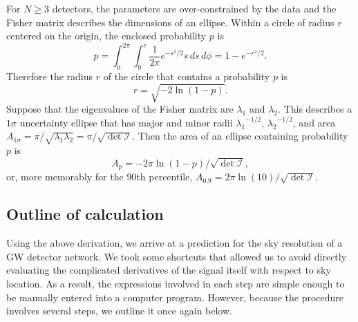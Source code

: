 \documentclass[amsmath,amssymb,aps,prx,reprint,nopreprintnumbers,nofootinbib,showpacs]{revtex4-1}
\begin{document}
For $N \geq 3$ detectors, the parameters are over\nobreakdashes-constrained by the data and the Fisher matrix describes the dimensions of an ellipse. Within a circle of radius $r$ centered on the origin, the enclosed probability $p$ is
%
\begin{equation}
    p = \int_0^{2\pi} \int_0^r \frac{1}{2\pi} e^{-s^2/2} s \, ds \, d\phi = 1 - e^{-r^2/2}.
\end{equation}
%
Therefore the radius $r$ of the circle that contains a probability $p$ is
%
\begin{equation}
    r = \sqrt{-2\ln (1 - p)}.
\end{equation}
%
Suppose that the eigenvalues of the Fisher matrix are $\lambda_1$ and $\lambda_2$. This describes a $1\sigma$ uncertainty ellipse that has major and minor radii ${\lambda_1}^{-1/2}$, ${\lambda_2}^{-1/2}$, and area $A_{1\sigma} = \pi / \sqrt{\lambda_1 \lambda_2} = \pi / \sqrt{\det\mathcal{I}}$. Then the area of an ellipse containing probability $p$ is
%
\begin{equation}\label{eq:a-pth-quantile}
    A_p = -2\pi\ln(1-p) / \sqrt{\det \mathcal{I}},
\end{equation}
%
or, more memorably for the $90$th percentile, $A_{0.9} = 2\pi\ln(10) / \sqrt{\det{\mathcal{I}}}$.

\subsection{Outline of calculation}
\label{sec:fisher-matrix-area-outline}

Using the above derivation, we arrive at a prediction for the sky resolution of a \ac{GW} detector network. We took some shortcuts that allowed us to avoid directly evaluating the complicated derivatives of the signal itself with respect to sky location. As a result, the expressions involved in each step are simple enough to be manually entered into a computer program. However, because the procedure involves several steps, we outline it once again below.
\end{document}
